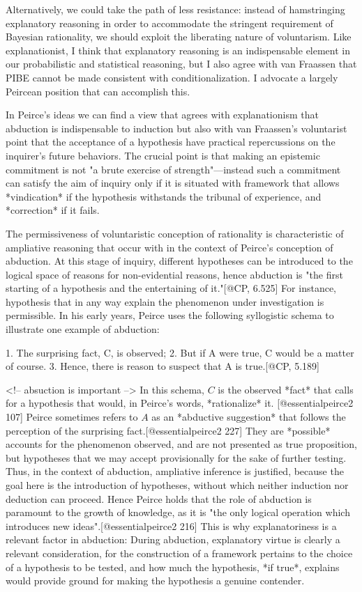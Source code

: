 Alternatively, we could take the path of less resistance: instead of
hamstringing explanatory reasoning in order to accommodate the stringent
requirement of Bayesian rationality, we should exploit the liberating
nature of voluntarism. Like explanationist, I think that explanatory
reasoning is an indispensable element in our probabilistic and
statistical reasoning, but I also agree with van Fraassen that PIBE
cannot be made consistent with conditionalization. I advocate a largely
Peircean position that can accomplish this.

In Peirce's ideas we can find a view that agrees with explanationism
that abduction is indispensable to induction but also with van
Fraassen's voluntarist point that the acceptance of a hypothesis have
practical repercussions on the inquirer's future behaviors. The crucial
point is that making an epistemic commitment is not "a brute exercise of
strength"---instead such a commitment can satisfy the aim of inquiry
only if it is situated with framework that allows *vindication* if the
hypothesis withstands the tribunal of experience, and *correction* if it
fails.

The permissiveness of voluntaristic conception of rationality is
characteristic of ampliative reasoning that occur with in the context of
Peirce's conception of abduction. At this stage of inquiry, different
hypotheses can be introduced to the logical space of reasons for
non-evidential reasons, hence abduction is "the first starting of a
hypothesis and the entertaining of it."{[}@CP, 6.525{]} For instance,
hypothesis that in any way explain the phenomenon under investigation is
permissible. In his early years, Peirce uses the following syllogistic
schema to illustrate one example of abduction:

1. The surprising fact, C, is observed; 2. But if A were true, C would
be a matter of course. 3. Hence, there is reason to suspect that A is
true.{[}@CP, 5.189{]}

\textless{}!-- absuction is important --\textgreater{} In this schema,
\(C\) is the observed *fact* that calls for a hypothesis that would, in
Peirce's words, *rationalize* it. {[}@essentialpeirce2 107{]} Peirce
sometimes refers to \(A\) as an *abductive suggestion* that follows the
perception of the surprising fact.{[}@essentialpeirce2 227{]} They are
*possible* accounts for the phenomenon observed, and are not presented
as true proposition, but hypotheses that we may accept provisionally for
the sake of further testing. Thus, in the context of abduction,
ampliative inference is justified, because the goal here is the
introduction of hypotheses, without which neither induction nor
deduction can proceed. Hence Peirce holds that the role of abduction is
paramount to the growth of knowledge, as it is "the only logical
operation which introduces new ideas".{[}@essentialpeirce2 216{]} This
is why explanatoriness is a relevant factor in abduction: During
abduction, explanatory virtue is clearly a relevant consideration, for
the construction of a framework pertains to the choice of a hypothesis
to be tested, and how much the hypothesis, *if true*, explains would
provide ground for making the hypothesis a genuine contender.

